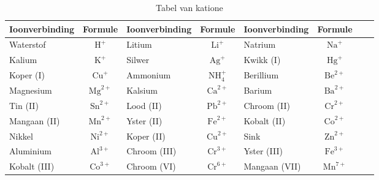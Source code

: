 \begin{enumerate}[noitemsep, label=\textbf{\arabic*}. ]
\begin{table}[H]
\begin{center}
\label{tab:cations}
\begin{tabular}{|l|c|l|c|l|c|l|c|} \hline
\textbf{Ioonverbinding} & \textbf{Formule} & \textbf{Ioonverbinding} & \textbf{Formule} & \textbf{Ioonverbinding} & \textbf{Formule}  \\ \hline
Waterstof       & $\text{H}^{+}$   & Litium          & $\text{Li}^{+}$     & Natrium          & $\text{Na}^{+}$  \\ \hline
Kalium          & $\text{K}^{+}$   & Silwer          & $\text{Ag}^{+}$     & Kwikk (I)        & $\text{Hg}^{+}$  \\ \hline
Koper (I)       & $\text{Cu}^{+}$  & Ammonium        & $\text{NH}_{4}^{+}$ & Berillium        & $\text{Be}^{2+}$ \\ \hline
Magnesium       & $\text{Mg}^{2+}$ & Kalsium         & $\text{Ca}^{2+}$    & Barium           & $\text{Ba}^{2+}$ \\ \hline
Tin (II)        & $\text{Sn}^{2+}$ & Lood (II)       & $\text{Pb}^{2+}$    & Chroom (II)      & $\text{Cr}^{2+}$ \\ \hline
Mangaan (II)    & $\text{Mn}^{2+}$ & Yster (II)      & $\text{Fe}^{2+}$    & Kobalt (II)      & $\text{Co}^{2+}$ \\ \hline
Nikkel          & $\text{Ni}^{2+}$ & Koper (II)      & $\text{Cu}^{2+}$    & Sink             & $\text{Zn}^{2+}$ \\ \hline
Aluminium       & $\text{Al}^{3+}$ & Chroom (III)    & $\text{Cr}^{3+}$    & Yster (III)      & $\text{Fe}^{3+}$ \\ \hline
Kobalt (III)    & $\text{Co}^{3+}$ & Chroom (VI)     & $\text{Cr}^{6+}$    & Mangaan (VII)    & $\text{Mn}^{7+}$ \\ \hline

\end{tabular}

 \end{center}
\caption{Tabel van katione}
\label{tab:cations}
\end{table}


\end{enumerate}
